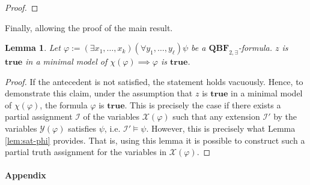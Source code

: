 \documentclass [11pt]{article}
\newcommand{\True}{\mathbf{true}}
\newcommand{\False}{\mathbf{false}}
\newcommand{\nmodels}{\not\models}
\newcommand{\var}{\mathit{Var}}
\newtheorem{lemma}[theorem]{Lemma}
\begin{document}
\begin{proof}
\end{proof}


Finally, allowing the proof of the main result.

\begin{lemma}
Let $\varphi:=(\exists x_1, \dots, x_k) (\forall y_1, \dots, y_\ell) \psi$ be a $\mathbf{QBF}_{2,\exists}$-formula.
$z$ is $\True$ in a minimal model of $\chi(\varphi) \implies \varphi$ is $\True$.
\end{lemma}
\begin{proof}
If the antecedent is not satisfied, the statement holds vacuously. 
Hence, to demonstrate this claim, under the assumption that $z$ is $\True$ in a minimal model of $\chi(\varphi)$, the formula $\varphi$ is $\True$. This is precisely the case if there exists a partial assignment $\mathcal{I}$ of the variables $\mathcal{X}(\varphi)$ such that any extension $\mathcal{I}'$ by the  variables $\mathcal{Y}(\varphi)$ satisfies $\psi$, i.e. $\mathcal{I}' \models \psi$.  However, this is precisely what Lemma \ref{lem:sat-phi} provides. That is, using this lemma it is possible to construct such a partial truth assignment for the variables in $\mathcal{X}(\varphi)$. 
\end{proof}


\newpage

\paragraph*{Appendix}
\end{document}
